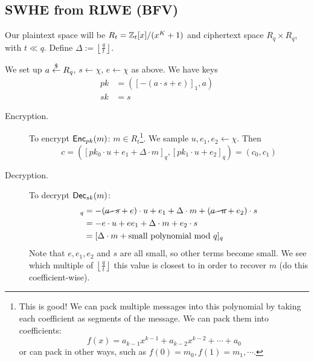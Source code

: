\subsection{SWHE from RLWE (BFV)}
Our plaintext space will be $R_t = \mathbb Z_t[x]/(x^K + 1)$ and ciphertext space $R_q\times R_q$, with $t\ll q$. Define $\Delta := \left\lfloor \frac{q}{t}\right\rfloor$.

We set up $a\overset{\$}{\leftarrow} R_q$, $s\leftarrow \chi$, $e\leftarrow \chi$ as above. We have keys
\begin{align*}
    pk & = \left( [-(a\cdot s + e)]_1, a \right) \\
    sk & = s
\end{align*}

\begin{description}
    \item[Encryption.] To encrypt $\operatorname{\mathsf{Enc}}_{pk}(m)$: $m\in R_t$\footnote{This is good! We can pack multiple messages into this polynomial by taking each coefficient as segments of the message. We can pack them into coefficients:
        \[f(x) = a_{k-1}x^{k-1} + a_{k-2}x^{k-2}+ \cdots + a_0\]
        or can pack in other ways, such as $f(0) = m_0, f(1) = m_1, \cdots$. }. We sample $u, e_1, e_2\leftarrow \chi$. Then
        \[c = \left( [pk_0\cdot u + e_1 + \Delta\cdot m]_q , [pk_1\cdot u + e_2]_q\right) = (c_0, c_1)\]
    \item[Decryption.] To decrypt $\operatorname{\mathsf{Dec}}_{sk}(m)$:
        \begin{align*}
            [c_0 + c_1\cdot s]_q & = -(\cancel{a\cdot s} + e) \cdot u + e_1 + \Delta\cdot m + (\cancel{a\cdot u} + e_2)\cdot s \\
                                 & = -e\cdot u + ee_1 + \Delta\cdot m + e_2\cdot s                                             \\
                                 & = [\Delta \cdot m + \text{small polynomial mod $q$}]_q
        \end{align*}
        Note that $e, e_1, e_2$ and $s$ are all small, so other terms become small. We see which multiple of $\left\lfloor \frac{q}{t}\right\rfloor$ this value is closest to in order to recover $m$ (do this coefficient-wise).


\end{description}
